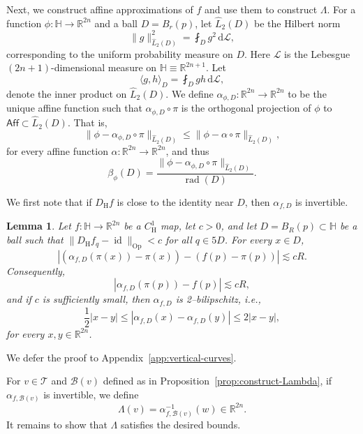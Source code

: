 \documentclass[12pt,reqno]{amsart}
\newcommand{\cB}{\mathcal{B}}
\newcommand{\cL}{\mathcal{L}}
\newcommand{\cT}{\mathcal{T}}
\newcommand{\DfH}{D_\mathrm{H}f}
\DeclareMathOperator{\rad}{rad}
\newcommand{\Aff}{\mathsf{Aff}}
\newcommand{\HH}{\mathbb{H}}
\newcommand{\R}{\mathbb{R}}
\newcommand{\ud}[0]{\,\mathrm{d}}
\newcommand{\from}{\colon}
\newtheorem{lemma}[thm]{Lemma}
\theoremstyle{remark}
\newcommand{\0}{\mathbf{0}}
\renewcommand{\1}{\mathbf 1}
\DeclareMathOperator{\id}{id}
\begin{document}
Next, we construct affine approximations of $f$ and use them to construct $\Lambda$.
For a function $\phi \from \HH\to \R^{2n}$ and a ball $D=B_r(p)$, let $\widehat{L}_2(D)$ be the Hilbert norm
$$
\|g\|_{\widehat{L}_2(D)}^2 = \fint_{D} g^2 \ud \cL,
$$
corresponding to the uniform probability measure on $D$. Here $\cL$ is the Lebesgue $(2n+1)$-dimensional measure on $\HH\equiv \mathbb R^{2n+1}$. Let
$$
\langle g, h\rangle_D = \fint_{D} g h \ud \cL,
$$
denote the inner product on ${\widehat{L}_2(D)}$. We define  $\alpha_{\phi,D}\from \R^{2n}\to \R^{2n}$ to be the unique affine function such that $\alpha_{\phi,D}\circ \pi$ is the orthogonal projection of $\phi$ to $\Aff\subset \widehat{L}_2(D)$. That is,
$$
\|\phi - \alpha_{\phi,D}\circ \pi\|_{\widehat{L}_2(D)} \le \|\phi - \alpha\circ \pi\|_{\widehat{L}_2(D)},
$$
for every affine function $\alpha\from \R^{2n}\to \R^{2n}$, and thus
\begin{equation}\label{eqn:BetaPhiAlpha-approx}
\beta_\phi(D) = \frac{\|\phi - \alpha_{\phi,D}\circ\pi\|_{\widehat{L}_2(D)}}{\rad(D)}.
\end{equation}

We first note that if $\DfH$ is close to the identity near $D$, then $\alpha_{f,D}$ is invertible.
\begin{lemma}\label{lem:bilipschitz-affine-v2}
  Let $f\from \HH\to \R^{2n}$ be a $C^1_{\mathrm{H}}$ map, let $c>0$, and let $D=B_R(p)\subset \HH$ be a ball such that $\|\DfH_q - \id\|_{\mathrm{Op}}<c$ for all $q\in 5D$. For every $x\in D$,
  \begin{equation}\label{eq:ControlAlpha2}
    |(\alpha_{f,D}(\pi(x))-\pi(x))-(f(p)-\pi(p))|\lesssim cR.
  \end{equation}
  Consequently,
  \begin{equation}\label{eq:ControlAlpha3}
    |\alpha_{f,D}(\pi(p))-f(p)|\lesssim cR,
  \end{equation}
  and if $c$ is sufficiently small, then $\alpha_{f,D}$ is 2--bilipschitz, i.e.,
\begin{equation}\label{eqnBilipControl}
    \frac{1}{2}|x-y|\leq |\alpha_{f,D}(x)-\alpha_{f,D}(y)| \leq 2|x-y|,
  \end{equation}
  for every $x,y\in \mathbb R^{2n}$.
\end{lemma}
We defer the proof to Appendix~\ref{app:vertical-curves}.

For $v\in \cT$ and $\cB(v)$ defined as in Proposition~\ref{prop:construct-Lambda}, if $\alpha_{f,\cB(v)}$ is invertible, we define
\begin{equation}\label{eq:def-lambda}
  \Lambda(v) = \alpha_{f,\cB(v)}^{-1}(w)\in \R^{2n}.
\end{equation}
It remains to show that $\Lambda$ satisfies the desired bounds. 
\end{document}
